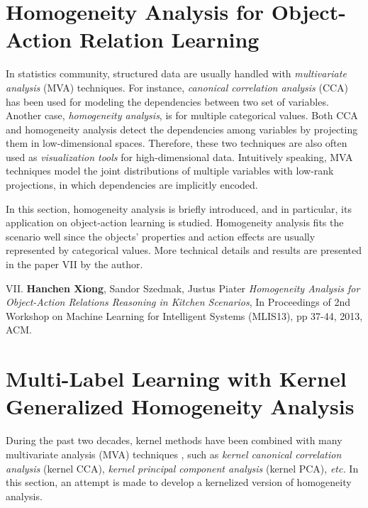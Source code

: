 \section{Homogeneity Analysis for Object-Action Relation Learning}
\label{sec:homo}
In statistics community, structured data are usually handled with \emph{multivariate analysis} (MVA) techniques. For instance,      
\emph{canonical correlation analysis} (CCA) has been used for modeling the dependencies between two set of variables. 
Another case, \emph{homogeneity analysis}, is for multiple categorical values. Both CCA and homogeneity analysis detect
the dependencies among variables by projecting them in low-dimensional spaces. Therefore, these two techniques are also  
often used as \emph{visualization tools} for high-dimensional data.   
Intuitively speaking, MVA techniques model the joint distributions of multiple variables with low-rank projections, in which 
dependencies are implicitly encoded.  


In this section, homogeneity analysis is briefly introduced, and in particular, its application on object-action learning is studied.      
Homogeneity analysis fits the scenario well since the objects' properties and action effects are usually represented by 
categorical values.  More technical details and results are presented in the paper VII by the author. 


\begin{shaded}
{\Huge VII.} \textbf{Hanchen Xiong}, Sandor Szedmak, Justus Piater {\it Homogeneity Analysis for Object-Action Relations Reasoning in Kitchen Scenarios}, 
In Proceedings of 2nd Workshop on Machine Learning for Intelligent Systems (MLIS13), pp 37-44,  2013, ACM. 
\vspace{-.2cm}
\end{shaded}




\section{Multi-Label Learning with Kernel Generalized Homogeneity Analysis}
\label{sec:KGHA}
During the past two decades, kernel methods have been combined with many multivariate analysis (MVA) techniques \citep{citeulike:Taylor_Nello_Kernel}, 
such as \emph{kernel canonical correlation analysis} (kernel CCA), 
\emph{kernel principal component analysis} (kernel PCA), \emph{etc.}  
In this section, an attempt is made to develop a kernelized version of homogeneity analysis.     

